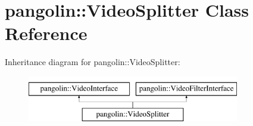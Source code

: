 \hypertarget{classpangolin_1_1_video_splitter}{}\section{pangolin\+:\+:Video\+Splitter Class Reference}
\label{classpangolin_1_1_video_splitter}
Inheritance diagram for pangolin\+:\+:Video\+Splitter\+:\begin{figure}[H]
\begin{center}
\leavevmode
\includegraphics[height=2.000000cm]{classpangolin_1_1_video_splitter}
\end{center}
\end{figure}
